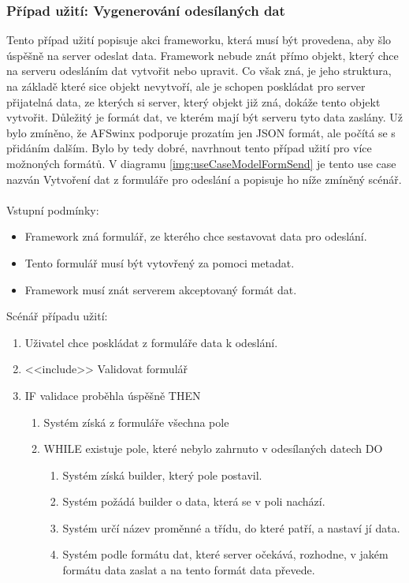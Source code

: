 \subsubsection{Případ užití: Vygenerování odesílaných dat}
Tento případ užití popisuje akci frameworku, která musí být provedena, aby šlo úspěšně na server odeslat data. Framework nebude znát přímo objekt, který chce na serveru odesláním dat vytvořit nebo upravit. Co však zná, je jeho struktura, na základě které sice objekt nevytvoří, ale je schopen poskládat pro server přijatelná data, ze kterých si server, který objekt již zná, dokáže tento objekt vytvořit. Důležitý je formát dat, ve kterém mají být serveru tyto data zaslány. Už bylo zmíněno, že AFSwinx podporuje prozatím jen JSON formát, ale počítá se s přidáním dalším. Bylo by tedy dobré, navrhnout tento případ užití pro více možnoných formátů. V diagramu \ref{img:useCaseModelFormSend} je tento use case nazván Vytvoření dat z formuláře pro odeslání a popisuje ho níže zmíněný scénář.\\\\
Vstupní podmínky:
\begin{itemize}
\item Framework zná formulář, ze kterého chce sestavovat data pro odeslání. 
\item Tento formulář musí být vytovřený za pomoci metadat. 
\item Framework musí znát serverem akceptovaný formát dat. 
\end{itemize}
Scénář případu užití:
\begin{enumerate}
\item Uživatel chce poskládat z formuláře data k odeslání.
\item <<include>> Validovat formulář
\item IF validace proběhla úspěšně THEN
\begin{enumerate}
\item Systém získá z formuláře všechna pole
\item WHILE existuje pole, které nebylo zahrnuto v odesílaných datech DO
\begin{enumerate}
\item Systém získá builder, který pole postavil.
\item Systém požádá builder o data, která se v poli nachází.
\item  Systém určí název proměnné a třídu, do které patří, a nastaví jí data.
\item  Systém podle formátu dat, které server očekává, rozhodne, v jakém formátu data zaslat a na tento formát data převede. 
\end{enumerate}
\end{enumerate}
\end{enumerate}

